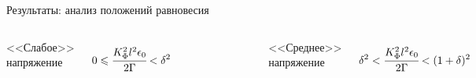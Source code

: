 \documentclass[aspectratio=169]{beamer}
\begin{document}
\begin{frame}{Результаты: анализ положений равновесия}
\vspace{-0.9cm}
\begin{columns}
	\begin{center}
		<<Слабое>> напряжение
	\end{center}
	\vspace{-0.2cm}
	$$0 \leqslant \cfrac{K_\Phi^2 l^2 \epsilon_0}{2 \Gamma} < \delta^2$$
	\vspace{-0.7cm}
	\begin{figure}
		\includegraphics[width=\textwidth]{figures/equilibriums_case_1.png}
	\end{figure}
	\begin{center}
		<<Среднее>> напряжение
	\end{center}
	\vspace{-0.2cm}
	$$\delta^2 < \cfrac{K_\Phi^2 l^2 \epsilon_0}{2 \Gamma} < (1 + \delta)^2$$
	\vspace{-0.7cm}
	\begin{figure}
		\includegraphics[width=\textwidth]{figures/equilibriums_case_2.png}

\end{figure}
\end{columns}
\end{frame}
\end{document}
